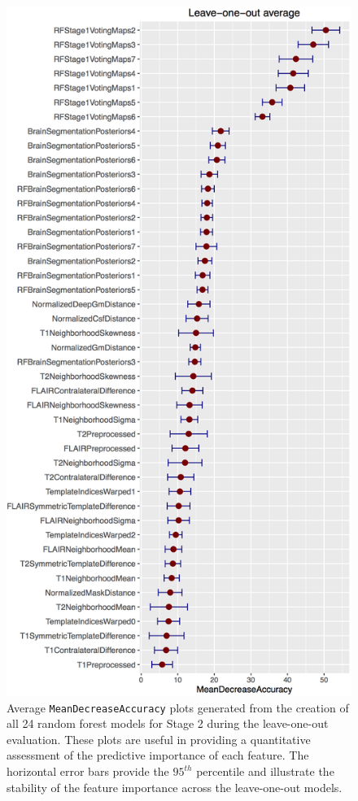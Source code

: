 \documentclass[11pt,]{article}
\begin{document}
\begin{figure}[htbp]
\centering
\includegraphics{Figures/averageLeaveOneOutStage2.png}
\caption{Average \texttt{MeanDecreaseAccuracy} plots generated from the
creation of all 24 random forest models for Stage 2 during the
leave-one-out evaluation. These plots are useful in providing a
quantitative assessment of the predictive importance of each feature.
The horizontal error bars provide the \(95^{th}\) percentile
 and illustrate the
stability of the feature importance across the leave-one-out models.
}
\end{figure}
\end{document}
